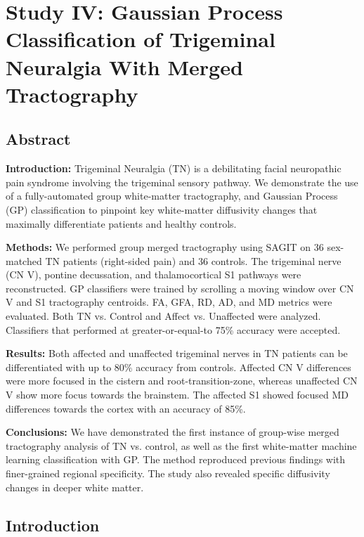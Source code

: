 \graphicspath{{images/tn-gp-sagit/drafts/}}

\chapter{Study IV: Gaussian Process Classification of Trigeminal Neuralgia With Merged Tractography}

\section{Abstract}
\textbf{Introduction:} Trigeminal Neuralgia (TN) is a debilitating facial neuropathic pain syndrome involving the trigeminal sensory pathway. We demonstrate the use of a fully-automated group white-matter tractography, and Gaussian Process (GP) classification to pinpoint key white-matter diffusivity changes that maximally differentiate patients and healthy controls. 

\textbf{Methods:} We performed group merged tractography using SAGIT on 36 sex-matched TN patients (right-sided pain) and 36 controls. The trigeminal nerve (CN V), pontine decussation, and thalamocortical S1 pathways were reconstructed. GP classifiers were trained by scrolling a moving window over CN V and S1 tractography centroids. FA, GFA, RD, AD, and MD metrics were evaluated. Both TN vs. Control and Affect vs. Unaffected were analyzed. Classifiers that performed at greater-or-equal-to 75\% accuracy were accepted.

\textbf{Results:} Both affected and unaffected trigeminal nerves in TN patients can be differentiated with up to 80\% accuracy from controls. Affected CN V differences were more focused in the cistern and root-transition-zone, whereas unaffected CN V show more focus towards the brainstem. The affected S1 showed focused MD differences towards the cortex with an accuracy of 85\%. 

\textbf{Conclusions:} We have demonstrated the first instance of group-wise merged tractography analysis of TN vs. control,  as well as the first white-matter machine learning classification with GP. The method reproduced previous findings with finer-grained regional specificity. The study also revealed specific diffusivity changes in deeper white matter.

\section{Introduction}
